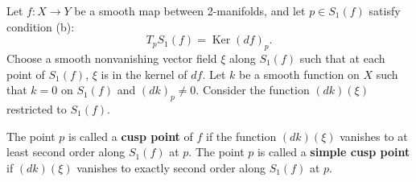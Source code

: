 Let $f: X \to Y$ be a smooth map between 2-manifolds, and let $p \in S_1(f)$ satisfy condition (b):
$$T_p S_1(f) = \operatorname{Ker}(df)_p.$$
Choose a smooth nonvanishing vector field $\xi$ along $S_1(f)$ such that at each point of $S_1(f)$, $\xi$ is in the kernel of $df$. Let $k$ be a smooth function on $X$ such that $k = 0$ on $S_1(f)$ and $(dk)_p \neq 0$. Consider the function $(dk)(\xi)$ restricted to $S_1(f)$.

The point $p$ is called a \textbf{cusp point} of $f$ if the function $(dk)(\xi)$ vanishes to at least second order along $S_1(f)$ at $p$. The point $p$ is called a \textbf{simple cusp point} if $(dk)(\xi)$ vanishes to exactly second order along $S_1(f)$ at $p$.
